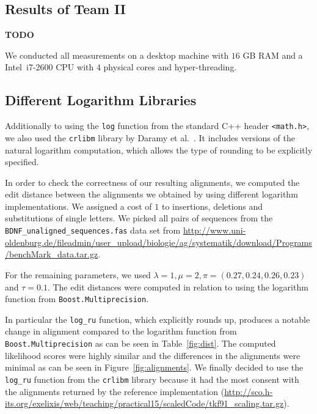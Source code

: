 \documentclass[runningheads,a4paper]{llncs}
\begin{document}
\subsection{Results of Team II}
{\bf TODO} 

We conducted all measurements on a desktop machine with $16$ GB RAM and
a Intel\texttrademark~i7-2600 CPU with $4$ physical cores and hyper-threading.

\subsection{Different Logarithm Libraries}
\label{sec:crlibm}

Additionally to using the \texttt{log} function from the standard C++ header \texttt{<math.h>}, we also used the \texttt{crlibm} library by Daramy et al.~\cite{Daramy04}. It includes versions of the natural logarithm computation, which allows the type of rounding to be explicitly specified.

In order to check the correctness of our resulting alignments, we computed the edit distance between the alignments we obtained by using different logarithm implementations. We assigned a cost of $1$ to insertions, deletions and substitutions of single letters. We picked all pairs of sequences from the \\ \texttt{BDNF\_unaligned\_sequences.fas} data set from \url{http://www.uni-oldenburg.de/fileadmin/user_upload/biologie/ag/systematik/download/Programs/benchMark_data.tar.gz}.

For the remaining parameters, we used $\lambda=1, \mu=2, \pi = (0.27, 0.24, 0.26,0.23)$ and $\tau = 0.1$. The edit distances were computed in relation to using the logarithm function from \texttt{Boost.Multiprecision}. 

In particular the \texttt{log\_ru} function, which explicitly rounds up, produces a notable change in alignment compared to the logarithm function from \\ \texttt{Boost.Multiprecision} as can be seen in Table~\ref{fig:dist}. The computed likelihood scores were highly similar and the differences in the alignments were minimal as can be seen in Figure~\ref{fig:alignments}. We finally decided to use the \texttt{log\_ru} function from the \texttt{crlibm} library because it had the most consent with the alignments returned by the reference implementation (\url{http://sco.h-its.org/exelixis/web/teaching/practical15/scaledCode/tkf91_scaling.tar.gz}).
\end{document}
